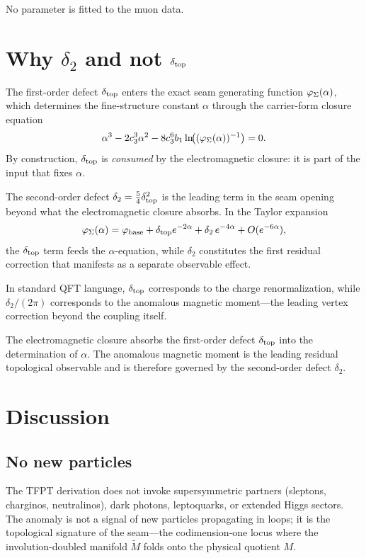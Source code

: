 No parameter is fitted to the muon data.

\section{Why \texorpdfstring{$\delta_2$}{delta2} and not
\texorpdfstring{$\delta_{\mathrm{top}}$}{delta-top}}\label{sec:why-delta2}

The first-order defect $\delta_{\mathrm{top}}$ enters the exact seam generating function
$\varphi_{\Sigma}(\alpha)$, which determines the fine-structure constant $\alpha$
through the carrier-form closure equation
\[
\alpha^3-2c_3^3\alpha^2-8c_3^6b_1\ln\!\bigl((\varphi_{\Sigma}(\alpha))^{-1}\bigr)=0.
\]
By construction, $\delta_{\mathrm{top}}$ is \emph{consumed} by the electromagnetic closure:
it is part of the input that fixes $\alpha$.

The second-order defect $\delta_2=\frac54\delta_{\mathrm{top}}^2$ is the leading term in the
seam opening beyond what the electromagnetic closure absorbs. In the Taylor
expansion
\[
\varphi_{\Sigma}(\alpha)
=
\varphi_{\mathrm{base}}+\delta_{\mathrm{top}} e^{-2\alpha}+\delta_2\,e^{-4\alpha}+O(e^{-6\alpha}),
\]
the $\delta_{\mathrm{top}}$ term feeds the $\alpha$-equation, while $\delta_2$ constitutes
the first residual correction that manifests as a separate observable effect.

In standard QFT language, $\delta_{\mathrm{top}}$ corresponds to the charge
renormalization, while $\delta_2/(2\pi)$ corresponds to the anomalous magnetic
moment---the leading vertex correction beyond the coupling itself.

\begin{proposition}
\label{prop:order-assignment}
The electromagnetic closure absorbs the first-order defect $\delta_{\mathrm{top}}$ into
the determination of $\alpha$. The anomalous magnetic moment is the
leading residual topological observable and is therefore governed by the
second-order defect $\delta_2$.
\end{proposition}


\section{Discussion}\label{sec:discussion}

\subsection{No new particles}

The TFPT derivation does not invoke supersymmetric partners (sleptons,
charginos, neutralinos), dark photons, leptoquarks, or extended Higgs
sectors. The anomaly is not a signal of new particles propagating in
loops; it is the topological signature of the seam---the codimension-one
locus where the involution-doubled manifold $\widetilde M$ folds onto
the physical quotient $M$.

